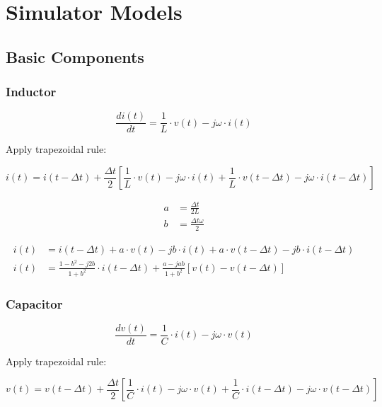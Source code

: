 \chapter{Simulator Models}

\section{Basic Components}

\subsection{Inductor}

\begin{equation}
        \frac{di(t)}{dt} = \frac{1}{L} \cdot v(t) - j \omega \cdot i(t)
\end{equation}

Apply trapezoidal rule:

\begin{equation}
        i(t) = i(t - \Delta t) + \frac{\Delta t}{2} \left[ \frac{1}{L} \cdot v(t) - j \omega \cdot i(t) + \frac{1}{L} \cdot v(t - \Delta t) - j \omega \cdot i(t - \Delta t) \right]
\end{equation}

\begin{align}
        a &= \frac{\Delta t}{2L} \\
        b &= \frac{\Delta t \omega}{2}
\end{align}

\begin{align}
        i(t) &= i(t - \Delta t) + a \cdot v(t) - j b \cdot i(t) + a \cdot v(t - \Delta t) - j b \cdot i(t - \Delta t) \\
        i(t) &= \frac{1-b^2-j2b}{1+b^2} \cdot i(t - \Delta t) + \frac{a-jab}{1+b^2} \left[ v(t) - v(t - \Delta t) \right]
\end{align}

\subsection{Capacitor}

\begin{equation}
        \frac{dv(t)}{dt} = \frac{1}{C} \cdot i(t) - j \omega \cdot v(t)
\end{equation}

Apply trapezoidal rule:

\begin{equation}
        v(t) = v(t - \Delta t) + \frac{\Delta t}{2} \left[ \frac{1}{C} \cdot i(t) - j \omega \cdot v(t) + \frac{1}{C} \cdot i(t - \Delta t) - j \omega \cdot v(t - \Delta t) \right]
\end{equation}

